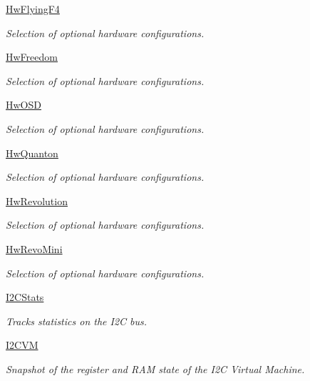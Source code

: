 \begin{DoxyCompactItemize}
\hyperlink{group___hw_flying_f4}{\-Hw\-Flying\-F4}
\begin{DoxyCompactList}\small\item\em \-Selection of optional hardware configurations. \end{DoxyCompactList}\item 
\hyperlink{group___hw_freedom}{\-Hw\-Freedom}
\begin{DoxyCompactList}\small\item\em \-Selection of optional hardware configurations. \end{DoxyCompactList}\item 
\hyperlink{group___hw_o_s_d}{\-Hw\-O\-S\-D}
\begin{DoxyCompactList}\small\item\em \-Selection of optional hardware configurations. \end{DoxyCompactList}\item 
\hyperlink{group___hw_quanton}{\-Hw\-Quanton}
\begin{DoxyCompactList}\small\item\em \-Selection of optional hardware configurations. \end{DoxyCompactList}\item 
\hyperlink{group___hw_revolution}{\-Hw\-Revolution}
\begin{DoxyCompactList}\small\item\em \-Selection of optional hardware configurations. \end{DoxyCompactList}\item 
\hyperlink{group___hw_revo_mini}{\-Hw\-Revo\-Mini}
\begin{DoxyCompactList}\small\item\em \-Selection of optional hardware configurations. \end{DoxyCompactList}\item 
\hyperlink{group___i2_c_stats}{\-I2\-C\-Stats}
\begin{DoxyCompactList}\small\item\em \-Tracks statistics on the \-I2\-C bus. \end{DoxyCompactList}\item 
\hyperlink{group___i2_c_v_m}{\-I2\-C\-V\-M}
\begin{DoxyCompactList}\small\item\em \-Snapshot of the register and \-R\-A\-M state of the \-I2\-C \-Virtual \-Machine. \end{DoxyCompactList}\item 

\end{DoxyCompactItemize}
